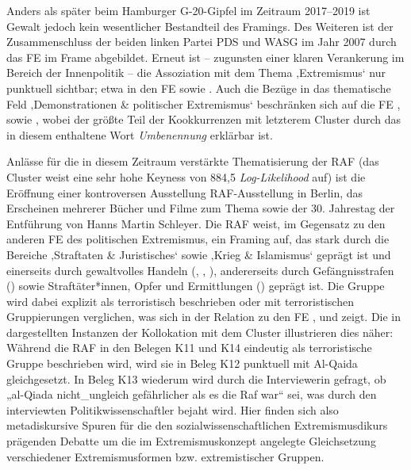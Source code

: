 Anders als später beim Hamburger G-20-Gipfel im Zeitraum 2017--2019 ist Gewalt jedoch kein wesentlicher Bestandteil des Framings. Des Weiteren ist der Zusammenschluss der beiden linken Partei PDS und WASG im Jahr 2007 durch das FE  im Frame abgebildet. Erneut ist -- zugunsten einer klaren Verankerung im Bereich der Innenpolitik -- die Assoziation mit dem Thema ‚Extremismus` nur punktuell sichtbar; etwa in den FE  sowie . Auch die Bezüge in das thematische Feld ‚Demonstrationen \& politischer Extremismus` beschränken sich auf die FE ,  sowie , wobei der größte Teil der Kookkurrenzen mit letzterem Cluster durch das in diesem enthaltene Wort \emph{Umbenennung} erklärbar ist.

Anlässe für die in diesem Zeitraum verstärkte Thematisierung der RAF (das Cluster weist eine sehr hohe Keyness von 884,5 \emph{Log-Likelihood} auf) ist die Eröffnung einer kontroversen Ausstellung RAF-Ausstellung in Berlin, das Erscheinen mehrerer Bücher und Filme zum Thema sowie der 30. Jahrestag der Entführung von Hanns Martin Schleyer. Die RAF weist, im Gegensatz zu den anderen FE des politischen Extremismus, ein Framing auf, das stark durch die Bereiche ‚Straftaten \& Juristisches` sowie ‚Krieg \& Islamismus` geprägt ist und einerseits durch gewaltvolles Handeln (, , ), andererseits durch Gefängnisstrafen () sowie Straftäter*innen, Opfer und Ermittlungen () geprägt ist. Die Gruppe wird dabei explizit als terroristisch beschrieben oder mit terroristischen Gruppierungen verglichen, was sich in der Relation zu den FE ,  und  zeigt. Die in  dargestellten Instanzen der Kollokation mit dem Cluster  illustrieren dies näher: Während die RAF in den Belegen K11 und K14 eindeutig als terroristische Gruppe beschrieben wird, wird sie in Beleg K12 punktuell mit Al-Qaida gleichgesetzt. In Beleg K13 wiederum wird durch die Interviewerin gefragt, ob „al-Qiada nicht\_ungleich gefährlicher als es die Raf war`` sei, was durch den interviewten Politikwissenschaftler bejaht wird. Hier finden sich also metadiskursive Spuren für die den sozialwissenschaftlichen Extremismusdikurs prägenden Debatte um die im Extremismuskonzept angelegte Gleichsetzung verschiedener Extremismusformen bzw. extremistischer Gruppen.
\largerpage


